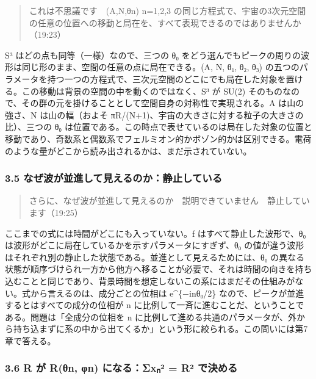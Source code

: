 \documentclass[
  a4paper,
]{ltjsarticle}
\begin{document}
\begin{quote}
これは不思議です　(A,N,θn) n=1,2,3
の同じ方程式で、宇宙の3次元空間の任意の位置への移動と局在を、すべて表現できるのではありませんか（19:23）
\end{quote}

S³ はどの点も同等（一様）なので、三つの θ₀
をどう選んでもピークの周りの波形は同じ形のまま、空間の任意の点に局在できる。(A,
N, θ₁, θ₂, θ₃)
の五つのパラメータを持つ一つの方程式で、三次元空間のどこにでも局在した対象を置ける。この移動は背景の空間の中を動くのではなく、S³
が SU(2)
そのものなので、その群の元を掛けることとして空間自身の対称性で実現される。A
は山の強さ、N は山の幅（およそ
πR/(N+1)、宇宙の大きさに対する粒子の大きさの比）、三つの θ₀
は位置である。この時点で表せているのは局在した対象の位置と移動であり、奇数系と偶数系でフェルミオン的かボゾン的かは区別できる。電荷のような量がどこから読み出されるかは、まだ示されていない。

\subsubsection{3.5
なぜ波が並進して見えるのか：静止している}\label{ux306aux305cux6ce2ux304cux4e26ux9032ux3057ux3066ux898bux3048ux308bux306eux304bux9759ux6b62ux3057ux3066ux3044ux308b}

\begin{quote}
さらに、なぜ波が並進して見えるのか　説明できていません　静止しています（19:25）
\end{quote}

ここまでの式には時間がどこにも入っていない。f はすべて静止した波形で、θ₀
は波形がどこに局在しているかを示すパラメータにすぎず、θ₀
の値が違う波形はそれぞれ別の静止した状態である。並進として見えるためには、θ₀
の異なる状態が順序づけられ一方から他方へ移ることが必要で、それは時間の向きを持ち込むことと同じであり、背景時間を想定しないこの系にはまだその仕組みがない。式から言えるのは、成分ごとの位相は
e\^{}\{−inθ₀/2\} なので、ピークが並進するとはすべての成分の位相が n
に比例して一斉に進むことだ、ということである。問題は「全成分の位相を n
に比例して進める共通のパラメータが、外から持ち込まずに系の中から出てくるか」という形に絞られる。この問いには第7章で答える。

\subsubsection{3.6 R が R(θn, φn) になる：Σxₙ² = R²
で決める}\label{r-ux304c-rux3b8n-ux3c6n-ux306bux306aux308bux3c3xux2099uxb2-ruxb2-ux3067ux6c7aux3081ux308b}
\end{document}
